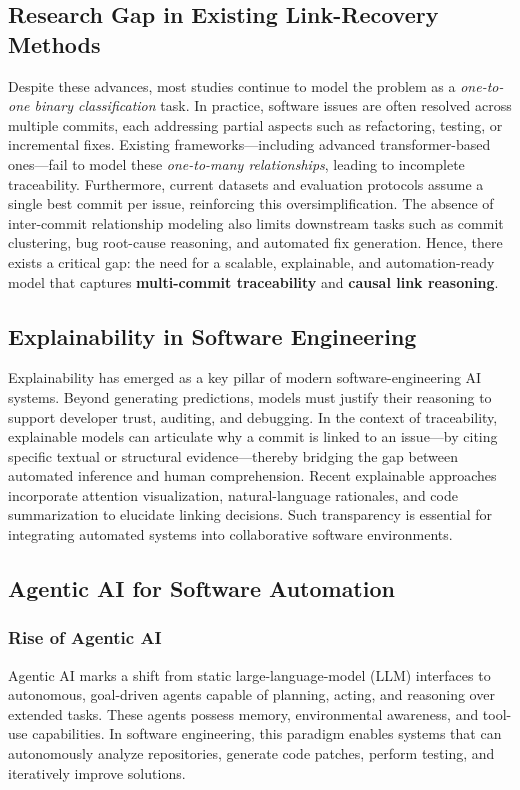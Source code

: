 \subsection{Research Gap in Existing Link-Recovery Methods}
Despite these advances, most studies continue to model the problem as a \emph{one-to-one binary classification} task. In practice, software issues are often resolved across multiple commits, each addressing partial aspects such as refactoring, testing, or incremental fixes. Existing frameworks—including advanced transformer-based ones—fail to model these \emph{one-to-many relationships}, leading to incomplete traceability.  
Furthermore, current datasets and evaluation protocols assume a single best commit per issue, reinforcing this oversimplification. The absence of inter-commit relationship modeling also limits downstream tasks such as commit clustering, bug root-cause reasoning, and automated fix generation.  
Hence, there exists a critical gap: the need for a scalable, explainable, and automation-ready model that captures \textbf{multi-commit traceability} and \textbf{causal link reasoning}.

\subsection{Explainability in Software Engineering}
Explainability has emerged as a key pillar of modern software-engineering AI systems. Beyond generating predictions, models must justify their reasoning to support developer trust, auditing, and debugging.  
In the context of traceability, explainable models can articulate why a commit is linked to an issue—by citing specific textual or structural evidence—thereby bridging the gap between automated inference and human comprehension.  
Recent explainable approaches incorporate attention visualization, natural-language rationales, and code summarization to elucidate linking decisions. Such transparency is essential for integrating automated systems into collaborative software environments.

\subsection{Agentic AI for Software Automation}
\subsubsection*{Rise of Agentic AI}
Agentic AI marks a shift from static large-language-model (LLM) interfaces to autonomous, goal-driven agents capable of planning, acting, and reasoning over extended tasks. These agents possess memory, environmental awareness, and tool-use capabilities. In software engineering, this paradigm enables systems that can autonomously analyze repositories, generate code patches, perform testing, and iteratively improve solutions.\\

